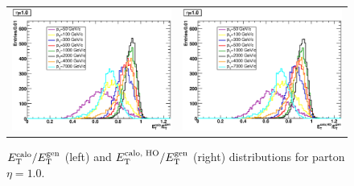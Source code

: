 \documentclass{cmspaper}
\begin{document}
\begin{figure}
 \centering
 \begin{tabular}{ll}
  \includegraphics[width=3in]{figs/h_ETRatio_ET_py_corr_eta1.0.eps} &
  \includegraphics[width=3in]{figs/h_ETRatioWithHO_ET_py_corr_eta1.0.eps} \\
 \end{tabular}
 \caption{$E^\text{calo}_\text T/E^\text{gen}_\text T$ (left) and $E^\text{calo, HO}_\text T/E^\text{gen}_\text T$ (right) distributions for parton $\eta=1.0$.}
 \label{fig:ETRatio_dist_10}
\end{figure}
\end{document}
